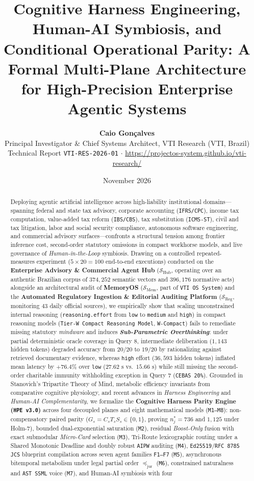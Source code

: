 \documentclass[10pt,twocolumn]{article}
\title{\vspace{-1.2em}\textbf{Cognitive Harness Engineering, Human-AI Symbiosis, and Conditional Operational Parity: A Formal Multi-Plane Architecture for High-Precision Enterprise Agentic Systems}}
\author{
  \textbf{Caio Gon\c{c}alves}\\
  \small Principal Investigator \& Chief Systems Architect, VTI Research (VTI, Brazil)\\
  \small Technical Report \texttt{VTI-RES-2026-01} $\cdot$ \url{https://projectos-system.github.io/vti-research/}
}
\date{November 2026}
\begin{document}
\maketitle

\begin{abstract}
Deploying agentic artificial intelligence across high-liability institutional domains---spanning federal and state tax advisory, corporate accounting (\texttt{IFRS/CPC}), income tax computation, value-added tax reform (\texttt{IBS/CBS}), tax substitution (\texttt{ICMS-ST}), civil and tax litigation, labor and social security compliance, autonomous software engineering, and commercial advisory surfaces---confronts a structural tension among frontier inference cost, second-order statutory omissions in compact workhorse models, and live governance of \emph{Human-in-the-Loop} symbiosis. Drawing on a controlled repeated-measures experiment ($5 \times 20 = 100$ end-to-end executions) conducted on the \textbf{Enterprise Advisory \& Commercial Agent Hub} ($\mathcal{S}_{\mathrm{Hub}}$, operating over an authentic Brazilian corpus of $374{,}252$ semantic vectors and $396{,}176$ normative acts) alongside an architectural audit of \textbf{MemoryOS} ($\mathcal{S}_{\mathrm{Mem}}$, part of \texttt{VTI OS System}) and the \textbf{Automated Regulatory Ingestion \& Editorial Auditing Platform} ($\mathcal{S}_{\mathrm{Reg}}$, monitoring $43$ daily official sources), we empirically show that scaling unconstrained internal reasoning (\texttt{reasoning.effort} from \texttt{low} to \texttt{medium} and \texttt{high}) in compact reasoning models (\texttt{Tier-W Compact Reasoning Model}, \texttt{W-Compact}) fails to remediate missing statutory \emph{mindware} and induces \textbf{\emph{Sub-Parametric Overthinking}}: under partial deterministic oracle coverage in Query 8, intermediate deliberation ($1{,}143$ hidden tokens) degraded accuracy from $20/20$ to $19/20$ by rationalizing against retrieved documentary evidence, whereas \texttt{high} effort ($36{,}593$ hidden tokens) inflated mean latency by $+76.4\%$ over \texttt{low} ($27.62\text{ s}$ vs.\ $15.66\text{ s}$) while still missing the second-order charitable immunity withholding exception in Query 7 (\texttt{CEBAS 20\%}). Grounded in Stanovich's Tripartite Theory of Mind, metabolic efficiency invariants from comparative cognitive physiology, and recent advances in \emph{Harness Engineering} and \emph{Human-AI Complementarity}, we formalize the \textbf{Cognitive Harness Parity Engine (\texttt{HPE v3.0})} across four decoupled planes and eight mathematical models (\texttt{M1--M8}): non-compensatory paired parity ($G_s = C_s T_s S_s \in \{0,1\}$, proving $n_j^* = 736$ and $1{,}125$ under Holm-7), bounded dual-exponential saturation (\texttt{M2}), residual \emph{Boost-Only} fusion with exact submodular \emph{Micro-Card} selection (\texttt{M3}), Tri-Route lexicographic routing under a Shared Monotonic Deadline and doubly robust \texttt{AIPW} auditing (\texttt{M4}), \texttt{Ed25519}/\texttt{RFC 8785 JCS} blueprint compilation across seven agent families \texttt{F1--F7} (\texttt{M5}), asynchronous bitemporal metabolism under legal partial order $\preceq_{\mathrm{jur}}$ (\texttt{M6}), constrained naturalness and \texttt{AST SSML} voice (\texttt{M7}), and Human-AI symbiosis with four 
\end{abstract}
\end{document}
